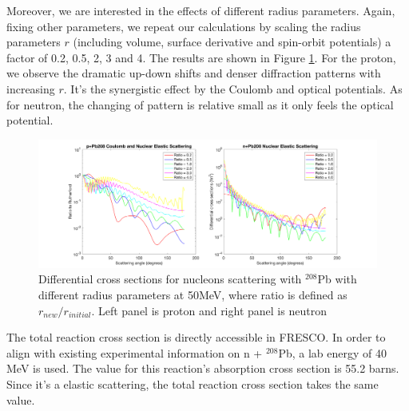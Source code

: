 \documentclass[12pt]{article}
\begin{document}
	Moreover, we are interested in the effects of different radius parameters. Again, fixing other parameters, we repeat our calculations by scaling the radius parameters $r$ (including volume, surface derivative and spin-orbit potentials) a factor of 0.2, 0.5, 2, 3 and 4. The results are shown in Figure \ref{fig:radiusparameter}. For the proton, we observe the dramatic up-down shifts and denser diffraction patterns with increasing $r$. It's the synergistic effect by the Coulomb and optical potentials. As for neutron, the changing of pattern is relative small as it only feels the optical potential. 
	
	
	\begin{figure}[t]
	\centering
	\includegraphics[width=1.0\textwidth]{7.png}
	\caption{Differential cross sections for nucleons scattering with $^{208}$Pb with different radius parameters at 50MeV, where ratio is defined as $r_{new}/r_{initial}$. Left panel is proton and right panel is neutron  }
	\label{fig:radiusparameter}
	\end{figure}
	
	The total reaction cross section is directly accessible in FRESCO. In order to align with existing experimental information on n + $^{208}$Pb, a lab energy of 40 MeV is used. The value for this reaction's absorption cross section is 55.2 barns. Since it's a elastic scattering, the total reaction cross section takes the same value.
	
\FloatBarrier



\end{document}
